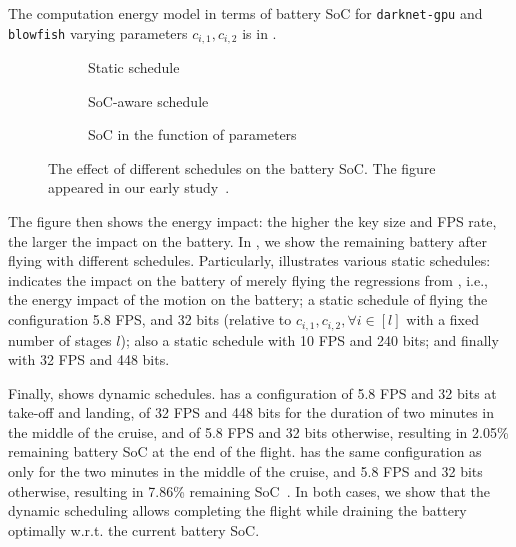 The computation energy model in terms of battery SoC for {\small\tt darknet-gpu} and {\small\tt blowfish} varying parameters $c_{i,1},c_{i,2}$ is in . 
\begin{figure}[h!]
  \centering
  \selectfont
  \footnotesize
  \begin{subfigure}[t]{0.31\textwidth}
    \centering
    
    \caption{Static schedule}
    \label{fig:soc-configuration}
  \end{subfigure}
  \begin{subfigure}[t]{0.26\textwidth}
    \centering
    
    \caption{SoC-aware schedule}
    \label{fig:soc-schedule}
  \end{subfigure}
  \begin{subfigure}[t]{0.41\textwidth}
    \centering
    
    \caption{SoC in the function of parameters}
    \label{fig:soc-plot}
  \end{subfigure}
  \caption[The effect of different schedules on the battery SoC]{The effect of different schedules on the battery SoC. The figure appeared in our early study~\citep{seewald2020mechanical}.}
  \label{fig:soc-evolution}
\end{figure}
The figure then shows the energy impact: the higher the key size and FPS rate, the larger the impact on the battery. In , we show the remaining battery after flying with different schedules. Particularly,  illustrates various static schedules:  indicates the impact on the battery of merely flying the regressions from , i.e., the energy impact of the motion on the battery;  a static schedule of flying the configuration 5.8 FPS, and 32 bits (relative to $c_{i,1},c_{i,2},\forall i\in[l]$ with a fixed number of stages $l$);  also a static schedule with 10 FPS and 240 bits; and finally  with 32 FPS and 448 bits.

Finally,  shows dynamic schedules.  has a configuration of 5.8 FPS and 32 bits at take-off and landing, of 32 FPS and 448 bits for the duration of two minutes in the middle of the cruise, and of 5.8 FPS and 32 bits otherwise, resulting in 2.05\% remaining battery SoC at the end of the flight.  has the same configuration as  only for the two minutes in the middle of the cruise, and 5.8 FPS and 32 bits otherwise, resulting in 7.86\% remaining SoC~\citep{seewald2020mechanical}. In both cases, we show that the dynamic scheduling allows completing the flight while draining the battery optimally w.r.t. the current battery SoC.

